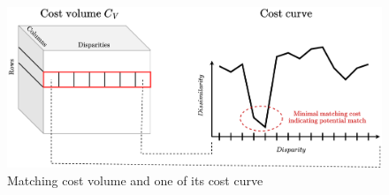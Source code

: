 \begin{figure}
	\centering
	\includegraphics[width=\linewidth]{Images/Chap_1/Cost_volume.png}
	\caption{Matching cost volume and one of its cost curve}
	\label{fig:cost_volume}
\end{figure}

